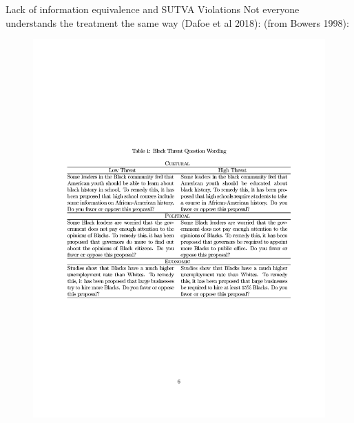 \documentclass[
  ignorenonframetext,
]{beamer}
\begin{document}
\begin{frame}{Lack of information equivalence and SUTVA Violations}
\protect\hypertarget{lack-of-information-equivalence-and-sutva-violations}{}
Not everyone understands the treatment the same way (Dafoe et al 2018):
(from Bowers 1998):

\begin{figure}

{\centering \includegraphics[width=0.8\linewidth]{./figs/survey-exp-bowers-1998-black-threat} 

}

\end{figure}
\end{frame}
\end{document}
